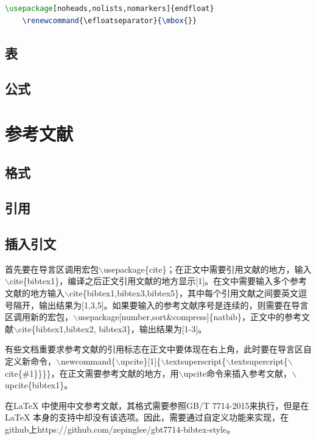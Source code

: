\documentclass[12pt]{book}
\begin{document}
\begin{lstlisting}[language=tex]
	\usepackage[noheads,nolists,nomarkers]{endfloat}
	\renewcommand{\efloatseparator}{\mbox{}}
\end{lstlisting}

\section{表}

\section{公式}

\chapter{参考文献}

\section{格式}

\section{引用}

\section{插入引文}

首先要在导言区调用宏包$\backslash$usepackage\{cite\}；在正文中需要引用文献的地方，输入$\backslash$cite\{bibtex1\}，编译之后正文引用文献的地方显示[1]。在文中需要输入多个参考文献的地方输入$\backslash$cite\{bibtex1,bibtex3,bibtex5\}，其中每个引用文献之间要英文逗号隔开，输出结果为[1,3,5]。如果要输入的参考文献序号是连续的，则需要在导言区调用新的宏包，$\backslash$usepackage[number,sort\&compress]\{natbib\}，正文中的参考文献$\backslash$cite\{bibtex1,bibtex2, bibtex3\}，输出结果为[1-3]。

有些文档重要求参考文献的引用标志在正文中要体现在右上角，此时要在导言区自定义新命令，$\backslash$newcommand\{$\backslash$upcite\}[1]\{$\backslash$textsuperscript\{$\backslash$textsupercript\{$\backslash$cite\{\#1\}\}\}\}，在正文需要参考文献的地方，用$\backslash$upcite命令来插入参考文献，$\backslash$upcite\{bibtex1\}。


在LaTeX{} 中使用中文参考文献，其格式需要参照GB/T 7714-2015来执行，但是在LaTeX{} 本身的支持中却没有该选项。因此，需要通过自定义功能来实现，在github上https://github.com/zepinglee/gbt7714-bibtex-style。
\end{document}
